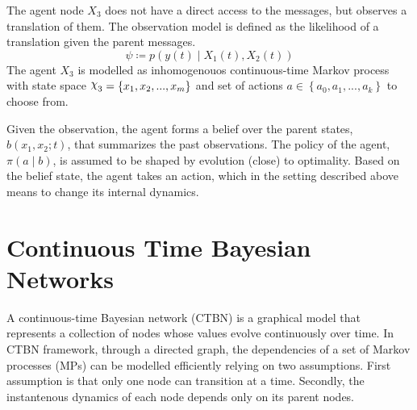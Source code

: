 The agent node $ X_3 $ does not have a direct access to the messages, but observes a translation of them. The observation model is defined as the likelihood of a translation given the parent messages.
\begin{equation}
\psi \coloneqq p(y(t) \mid X_{1}(t), X_{2}(t))
\end{equation}
The agent  $ X_{3} $ is modelled as inhomogenouos continuous-time Markov process with state space $ \rchi_{3} = \left\lbrace x_{1}, x_{2}, ..., x_{m} \right\rbrace  $ and set of actions $ a \in \left\lbrace a_{0}, a_{1}, ..., a_{k}\right\rbrace  $ to choose from. 

Given the observation, the agent forms a belief over the parent states, $  b(x_{1}, x_{2}; t) $, that summarizes the past observations.\cite{KAELBLING199899} The policy of the agent, $ \pi(a \mid b) $, is assumed to be shaped by evolution (close) to optimality. Based on the belief state, the agent takes an action, which in the setting described above means to change its internal dynamics. 
\section{Continuous Time Bayesian Networks}
A continuous-time Bayesian network (CTBN) is a graphical model that represents a collection of nodes whose values evolve continuously over time. In CTBN framework, through a directed graph, the dependencies of a set of Markov processes (MPs) can be modelled efficiently relying on two assumptions. First assumption is that only one node can transition at a time. Secondly, the instantenous dynamics of each node depends only on its parent nodes. \cite{Cohn2010a, Nodelman1995} 
